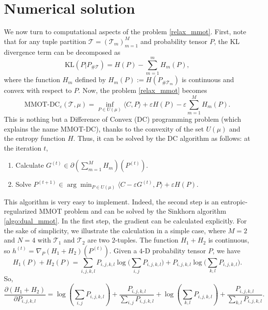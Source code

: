 \documentclass{article}
\begin{document}
\section{Numerical solution} \label{sec:algo}
We now turn to computational aspects of the problem \ref{relax_mmot}. First, note that for any tuple partition 
$\mathcal T = (\mathcal T_m)_{m=1}^M$ and probability tensor $P$, the KL divergence term can be decomposed as 
\begin{equation*}
  \text{KL}(P \vert P_{\# \mathcal T}) = H(P) - \sum_{m=1}^m H_m(P),
\end{equation*}
where the function $H_m$ defined by $H_m(P) := H(P_{\# \mathcal T_m})$ is continuous and convex with respect to $P$. 
Now, the problem \ref{relax_mmot} becomes
\begin{equation} \label{relax}
  \text{MMOT-DC}_{\varepsilon}(\mathcal T, \mu) = \inf_{P \in U(\mu)} 
  \langle C, P \rangle + \varepsilon H(P) - \varepsilon \sum_{m=1}^M H_m(P).
\end{equation}
This is nothing but a Difference of Convex (DC) programming problem (which explains the name MMOT-DC), 
thanks to the convexity of the set $U(\mu)$ and the entropy function $H$. Thus, it can be solved by the DC algorithm 
\citep{Tao86,Tao97} as follows: at the iteration $t$,
\begin{enumerate}
  \item Calculate $G^{(t)} \in \partial(\sum_{m=1}^M H_m)(P^{(t)})$.
  \item Solve $P^{(t+1)} \in \arg\min_{P \in U(\mu)} \langle C -
  \varepsilon G^{(t)}, P \rangle + \varepsilon H(P)$.
\end{enumerate}
This algorithm is very easy to implement. Indeed, the second step is an entropic-regularized MMOT problem and 
can be solved by the Sinkhorn algorithm \ref{algo:dual_mmot}. In the first step, the gradient can be calculated explicitly. 
For the sake of simplicity, we illustrate the calculation in a simple case, where $M=2$ and $N=4$ with 
$\mathcal T_1$ and $\mathcal T_2$ are two $2$-tuples. The function $H_1 + H_2$ is continuous, so 
$h^{(t)} = \nabla_P (H_1 + H_2)(P^{(t)})$. Given a $4$-D probability tensor $P$, we have
\begin{equation*}
  H_1(P) + H_2(P) = \sum_{i,j,k,l} P_{i,j,k,l} 
  \log\big( \sum_{i,j} P_{i,j,k,l} \big) + P_{i,j,k,l} \log\big( \sum_{k,l} P_{i,j,k,l} \big).
\end{equation*}
So,
\begin{equation*} \label{optim_condition}
  \frac{\partial (H_1 + H_2)}{\partial P_{i,j,k,l}} = \log \left( \sum_{i,j} P_{i,j,k,l} \right) + 
  \frac{P_{i,j,k,l}}{\sum_{i,j} P_{i,j,k,l}} + 
  \log \left( \sum_{k,l} P_{i,j,k,l} \right) + \frac{P_{i,j,k,l}}{\sum_{k,l} P_{i,j,k,l}}.
\end{equation*}
\end{document}
